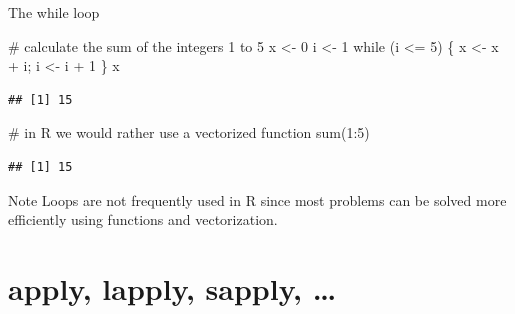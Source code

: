 \documentclass[
  9pt,
  ignorenonframetext,
]{beamer}
\newenvironment{Shaded}{\begin{snugshade}}{\end{snugshade}}
\newcommand{\CommentTok}[1]{\textcolor[rgb]{0.50,0.62,0.50}{#1}}
\newcommand{\ControlFlowTok}[1]{\textcolor[rgb]{0.94,0.87,0.69}{#1}}
\newcommand{\DecValTok}[1]{\textcolor[rgb]{0.86,0.86,0.80}{#1}}
\newcommand{\KeywordTok}[1]{\textcolor[rgb]{0.94,0.87,0.69}{#1}}
\newcommand{\NormalTok}[1]{\textcolor[rgb]{0.80,0.80,0.80}{#1}}
\newcommand{\OperatorTok}[1]{\textcolor[rgb]{0.94,0.94,0.82}{#1}}
\newcommand{\StringTok}[1]{\textcolor[rgb]{0.80,0.58,0.58}{#1}}
\begin{document}
\begin{frame}[fragile]{The while loop}
\protect\hypertarget{the-while-loop}{}
\small

\begin{Shaded}
\begin{Highlighting}[]
\CommentTok{\# calculate the sum of the integers 1 to 5}
\NormalTok{x \textless{}{-}}\StringTok{ }\DecValTok{0}
\NormalTok{i \textless{}{-}}\StringTok{ }\DecValTok{1}
\ControlFlowTok{while}\NormalTok{ (i }\OperatorTok{\textless{}=}\StringTok{ }\DecValTok{5}\NormalTok{) \{ x \textless{}{-}}\StringTok{ }\NormalTok{x }\OperatorTok{+}\StringTok{ }\NormalTok{i; i \textless{}{-}}\StringTok{ }\NormalTok{i }\OperatorTok{+}\StringTok{ }\DecValTok{1}\NormalTok{ \}}
\NormalTok{x}
\end{Highlighting}
\end{Shaded}

\begin{verbatim}
## [1] 15
\end{verbatim}

\begin{Shaded}
\begin{Highlighting}[]
\CommentTok{\# in R we would rather use a vectorized function}
\KeywordTok{sum}\NormalTok{(}\DecValTok{1}\OperatorTok{:}\DecValTok{5}\NormalTok{)}
\end{Highlighting}
\end{Shaded}

\begin{verbatim}
## [1] 15
\end{verbatim}

\vfill

\begin{block}{Note}
\protect\hypertarget{note-1}{}
Loops are not frequently used in R since most problems can be solved
more efficiently using functions and vectorization.
\end{block}
\end{frame}

\hypertarget{apply-lapply-sapply}{%
\section{apply, lapply, sapply, \ldots{}}\label{apply-lapply-sapply}}
\end{document}

